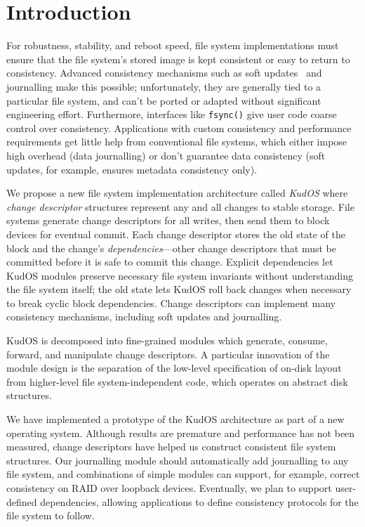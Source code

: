 
\section*{Introduction}
\label{sec:intro}

For robustness, stability, and reboot speed, file system implementations
must ensure that the file system's stored image is kept consistent
or easy to return to consistency.
%
Advanced consistency mechanisms such as soft updates~\cite{ganger00soft}
and journalling make this possible; unfortunately,
%
they are generally tied to a particular file system, and
can't be ported or adapted without significant engineering
effort.
%
Furthermore, interfaces like \verb+fsync()+ give user code coarse control
over consistency.
%
Applications with custom consistency and performance requirements get
little help from conventional file systems, which either impose high
overhead (data journalling) or don't guarantee data consistency (soft
updates, for example, ensures metadata consistency only).



We propose a new file system implementation architecture called
\emph{KudOS}
%
where \emph{change descriptor} structures represent any and all changes to
stable storage.
%
File systems generate change descriptors for all writes, then
send them to block devices for eventual commit.
%
Each change descriptor stores the old state of the block and the change's
\emph{dependencies}---other change descriptors that must be committed before
it is safe to commit this change.
%
Explicit dependencies let KudOS modules preserve necessary file system
invariants without understanding the file system itself; the old state
lets KudOS roll back changes when necessary to break cyclic block dependencies.
%
Change descriptors can implement many
consistency mechanisms, including soft updates and journalling.

KudOS is decomposed into fine-grained modules which generate, consume,
forward, and manipulate change descriptors. A particular innovation of the
module design is the separation of the low-level specification of on-disk layout
from higher-level file system-independent code, which operates on abstract disk
structures.

We have implemented a prototype of the KudOS
architecture as part of a new operating system.
%
Although results are premature and performance has not been measured,
change descriptors have helped us construct consistent file
system structures.
%
Our journalling module should automatically add journalling to any file
system, and combinations of simple modules can support, for example,
correct consistency on RAID over loopback devices.
%
Eventually, we plan to support user-defined dependencies,
allowing applications to define consistency protocols for the file system
to follow.


